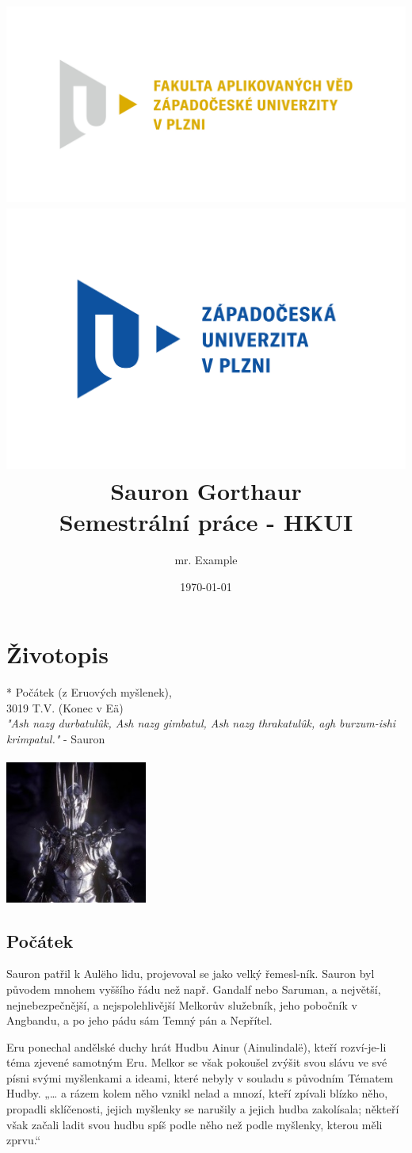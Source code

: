 \documentclass[12pt]{article}
\title{\includegraphics[scale=0.3]{pic/FAV_cmyk.png} \hfill \includegraphics[scale=0.3]{pic/ZCU_cmyk.png} \\ \vspace{2cm} Sauron Gorthaur \\ Semestrální práce - HKUI}
\author{mr. Example}
\date{\today}
\begin{document}
\maketitle
\thispagestyle{empty}
\newpage

\setcounter{page}{1}
\section{Životopis}

\begin{vwcol}[widths={0.6,0.4}, sep=.8cm, justify=flush,rule=0pt,indent=1em] 
* Počátek (z Eruových myšlenek), \\ 
\textdagger{} 3019 T.V. (Konec v Eä)
\vspace{1cm} \\
\textit{"Ash nazg durbatulûk, Ash nazg gimbatul, Ash nazg thrakatulûk, agh burzum-ishi krimpatul."} - Sauron
\paragraph{}
\includegraphics[width=0.35\textwidth]{pic/sauron-foto.jpg}    
\newline
\end{vwcol} 

\subsection{Počátek}
Sauron patřil k Aulëho lidu, projevoval se jako velký řemesl-ník. Sauron byl původem mnohem vyššího řádu než např. Gandalf nebo Saruman, a největší, nejnebezpečnější, a nejspolehlivější Melkorův služebník, jeho pobočník v Angbandu, a po jeho pádu sám Temný pán a Nepřítel.

Eru ponechal andělské duchy hrát Hudbu Ainur (Ainulindalë), kteří rozví-je-li téma zjevené samotným Eru. Melkor se však pokoušel zvýšit svou slávu ve své písni svými myšlenkami a ideami, které nebyly v souladu s původním Tématem Hudby. „… a rázem kolem něho vznikl nelad a mnozí, kteří zpívali blízko něho, propadli sklíčenosti, jejich myšlenky se narušily a jejich hudba zakolísala; někteří však začali ladit svou hudbu spíš podle něho než podle myšlenky, kterou měli zprvu.“
\end{document}
